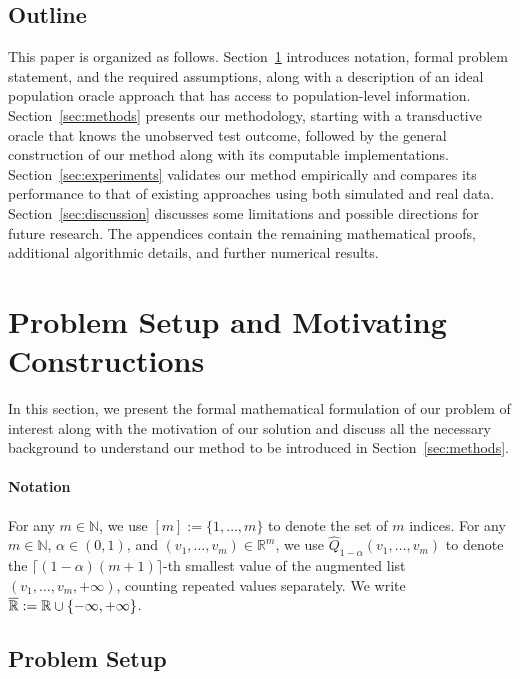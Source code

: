 \subsection{Outline}

This paper is organized as follows.
Section~\ref{sec:preliminaries} introduces notation, formal problem statement, and the required assumptions, along with a description of an ideal population oracle approach that has access to population-level information.
Section~\ref{sec:methods} presents our methodology, starting with a transductive oracle that knows the unobserved test outcome, followed by the general construction of our method along with its computable implementations.
Section~\ref{sec:experiments} validates our method empirically and compares its performance to that of existing approaches using both simulated and real data.
Section~\ref{sec:discussion} discusses some limitations and possible directions for future research.
The appendices contain the remaining mathematical proofs, additional algorithmic details, and further numerical results.

\clearpage

\section{Problem Setup and Motivating Constructions}
\label{sec:preliminaries}

In this section, we present the formal mathematical formulation of our problem of interest along with the motivation of our solution and discuss all the necessary background to understand our method to be introduced in Section~\ref{sec:methods}.

\paragraph{Notation}

For any $m\in\mathbb N$, we use $[m]:=\{1,\ldots,m\}$ to denote the set of $m$ indices.
For any $m\in\mathbb N$, $\alpha\in(0,1)$, and $(v_1,\ldots,v_m)\in\mathbb R^m$, we use $\hat Q_{1-\alpha}(v_1,\ldots,v_m)$ to denote the $\lceil(1-\alpha)(m+1)\rceil$-th smallest value of the augmented list $(v_1,\ldots,v_m,+\infty)$, counting repeated values separately. We write $\overline{\mathbb{R}}:=\mathbb{R}\cup\{-\infty,+\infty\}$.

\subsection{Problem Setup}

